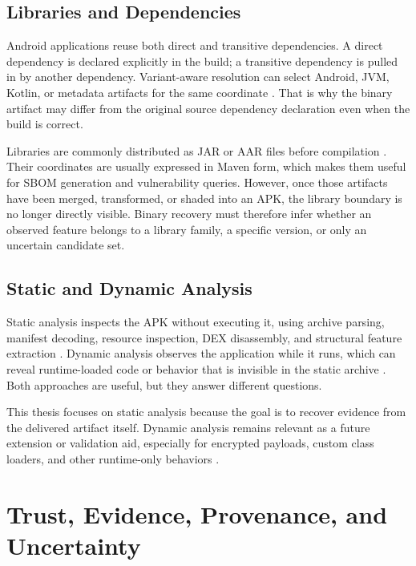 \subsection{Libraries and Dependencies}

Android applications reuse both direct and transitive dependencies. A direct
dependency is declared explicitly in the build; a transitive dependency is
pulled in by another dependency. Variant-aware resolution can select Android,
JVM, Kotlin, or metadata artifacts for the same coordinate
\cite{gradleVariantResolution}. That is why the binary artifact may differ
from the original source dependency declaration even when the build is
correct.

Libraries are commonly distributed as JAR or AAR files before compilation
\cite{androidLibrary}. Their coordinates are usually expressed in Maven form,
which makes them useful for SBOM generation and vulnerability queries.
However, once those artifacts have been merged, transformed, or shaded into an
APK, the library boundary is no longer directly visible. Binary recovery must
therefore infer whether an observed feature belongs to a library family, a
specific version, or only an uncertain candidate set.

\subsection{Static and Dynamic Analysis}

Static analysis inspects the APK without executing it, using archive parsing,
manifest decoding, resource inspection, DEX disassembly, and structural
feature extraction \cite{owaspStaticAnalysis}. Dynamic analysis observes the
application while it runs, which can reveal runtime-loaded code or behavior
that is invisible in the static archive \cite{owaspReverseEngineering}. Both
approaches are useful, but they answer different questions.

This thesis focuses on static analysis because the goal is to recover
evidence from the delivered artifact itself. Dynamic analysis remains relevant
as a future extension or validation aid, especially for encrypted payloads,
custom class loaders, and other runtime-only behaviors
\cite{androidDynamicCode}.

\section{Trust, Evidence, Provenance, and Uncertainty}

